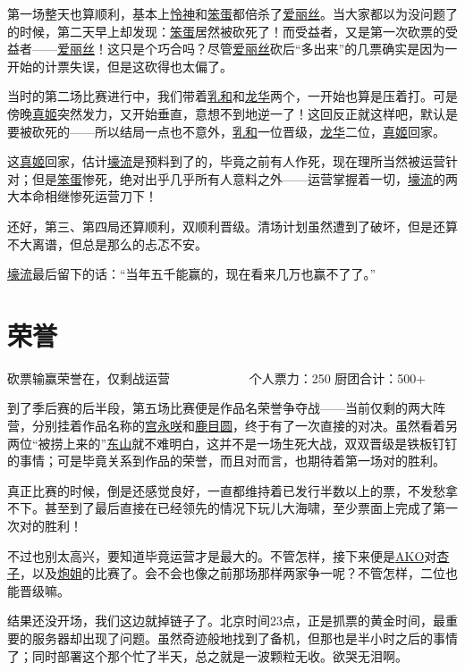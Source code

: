 第一场整天也算顺利，基本上\uline{怜神}和\uline{笨蛋}都倍杀了\uline{爱丽丝}。当大家都以为没问题了的时候，第二天早上却发现：\uline{笨蛋}居然被砍死了！而受益者，又是第一次砍票的受益者——\uline{爱丽丝}！这只是个巧合吗？尽管\uline{爱丽丝}砍后“多出来”的几票确实是因为一开始的计票失误，但是这砍得也太偏了。

当时的第二场比赛进行中，我们带着\uline{乳和}和\uline{龙华}两个，一开始也算是压着打。可是傍晚\uline{真姬}突然发力，又开始垂直，意想不到地逆一了！这回反正就这样吧，默认是要被砍死的——所以结局一点也不意外，\uline{乳和}一位晋级，\uline{龙华}二位，\uline{真姬}回家。

这\uline{真姬}回家，估计\uline{壕流}是预料到了的，毕竟之前有人作死，现在理所当然被运营针对；但是\uline{笨蛋}惨死，绝对出乎几乎所有人意料之外——运营掌握着一切，\uline{壕流}的两大本命相继惨死运营刀下！

还好，第三、第四局还算顺利，双顺利晋级。清场计划虽然遭到了破坏，但是还算不大离谱，但总是那么的忐忑不安。

\uline{壕流}最后留下的话：“当年五千能赢的，现在看来几万也赢不了了。”

\chapter{荣誉}
\begin{center}
{\subTitle 砍票输赢荣誉在，仅剩战运营}
\subMemo
　　　　　　个人票力：250 厨团合计：500+
\end{center}

到了季后赛的后半段，第五场比赛便是作品名荣誉争夺战——当前仅剩的两大阵营，分别挂着作品名称的\uline{宫永咲}和\uline{鹿目圆}，终于有了一次直接的对决。虽然看着另两位“被捞上来的”\uline{东山}就不难明白，这并不是一场生死大战，双双晋级是铁板钉钉的事情；可是毕竟关系到作品的荣誉，而且对而言，也期待着第一场对的胜利。

真正比赛的时候，倒是还感觉良好，一直都维持着已发行半数以上的票，不发愁拿不下。甚至到了最后直接在已经领先的情况下玩儿大海啸，至少票面上完成了第一次对的胜利！

不过也别太高兴，要知道毕竟运营才是最大的。不管怎样，接下来便是\uline{AKO}对\uline{杏子}，以及\uline{炮姐}的比赛了。会不会也像之前那场那样两家争一呢？不管怎样，二位也能晋级嘛。

结果还没开场，我们这边就掉链子了。北京时间23点，正是抓票的黄金时间，最重要的服务器却出现了问题。虽然奇迹般地找到了备机，但那也是半小时之后的事情了；同时部署这个那个忙了半天，总之就是一波颗粒无收。欲哭无泪啊。

